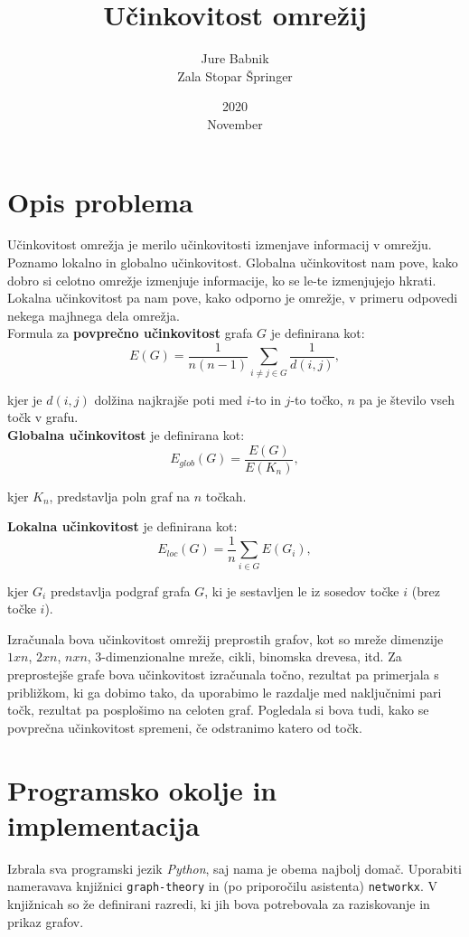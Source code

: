 \documentclass[a4paper, 16pt]{article}
\title{Učinkovitost omrežij}
\date{2020\\ November}
\author{Jure Babnik \\  Zala Stopar Špringer}
\begin{document}
\maketitle

\section{Opis problema}

Učinkovitost omrežja je merilo učinkovitosti izmenjave informacij v omrežju. Poznamo lokalno in globalno učinkovitost. Globalna učinkovitost nam pove, kako dobro si celotno omrežje
izmenjuje informacije, ko se le-te izmenjujejo hkrati. Lokalna učinkovitost pa nam pove, kako odporno je omrežje, v primeru odpovedi nekega majhnega dela omrežja.\\

Formula za \textbf{povprečno učinkovitost} grafa $G$ je definirana kot:
$$ E(G) = \frac{1}{n(n-1)} \sum_{i\neq j \in G} \frac{1}{d(i,j)},$$

kjer je $d(i,j)$ dolžina najkrajše poti med $i$-to in $j$-to točko, $n$ pa je število vseh točk v grafu.\\

\textbf{Globalna učinkovitost} je definirana kot:
$$ E_{glob}(G) = \frac{E(G)}{E(K_n)}, $$

kjer $K_n$, predstavlja poln graf na $n$ točkah.


\textbf{Lokalna učinkovitost} je definirana kot:
$$ E_{loc}(G) = \frac{1}{n} \sum_{i \in G} E(G_i), $$

kjer $G_i$ predstavlja podgraf grafa $G$, ki je sestavljen le iz sosedov točke $i$ (brez točke $i$).

Izračunala bova učinkovitost omrežij preprostih grafov, kot so mreže dimenzije $1 x n$, $2 x n$, $n x n$, 3-dimenzionalne mreže, cikli, binomska drevesa, itd.
Za preprostejše grafe bova učinkovitost izračunala točno, rezultat pa primerjala s približkom, ki ga dobimo tako, da uporabimo le razdalje med naključnimi pari točk, 
rezultat pa posplošimo na celoten graf. Pogledala si bova tudi, kako se povprečna učinkovitost spremeni, če odstranimo katero od točk. 

\section{Programsko okolje in implementacija}

Izbrala sva programski jezik \emph{Python}, saj nama je obema najbolj domač. Uporabiti nameravava knjižnici \texttt{graph-theory} in (po priporočilu asistenta) \texttt{networkx}.
V knjižnicah so že definirani razredi, ki jih bova potrebovala za raziskovanje in prikaz grafov. 
\end{document}
